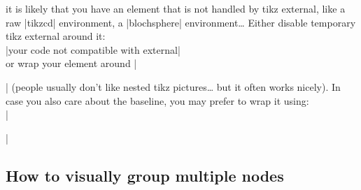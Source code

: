 \documentclass[a4paper,doc2]{ltxdoc} %
\begin{document}
it is likely that you have an element that is not handled by tikz external, like a raw |tikzcd| environment, a |blochsphere| environment\dots{} Either disable temporary tikz external around it:\\
|{\tikzexternaldisable your code not compatible with external}|\\
or wrap your element around || (people usually don't like nested tikz pictures\dots{} but it often works nicely). In case you also care about the baseline, you may prefer to wrap it using:\\
||

\subsection{How to visually group multiple nodes}\label{subsec:decoration}
\end{document}
